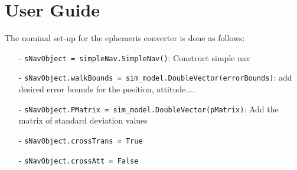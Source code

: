 \section{User Guide}

The nominal set-up for the ephemeris converter is done as follows:

\begin{itemize}
\item[-]     \texttt{sNavObject = simpleNav.SimpleNav()}: Construct simple nav
\item[-]     \texttt{sNavObject.walkBounds = sim\_model.DoubleVector(errorBounds)}: add desired error bounds for the position, attitude....
\item[-]     \texttt{sNavObject.PMatrix = sim\_model.DoubleVector(pMatrix)}: Add the matrix of standard deviation values
\item[-]    \texttt{sNavObject.crossTrans = True}
\item[-]    \texttt{sNavObject.crossAtt = False}
\end{itemize}